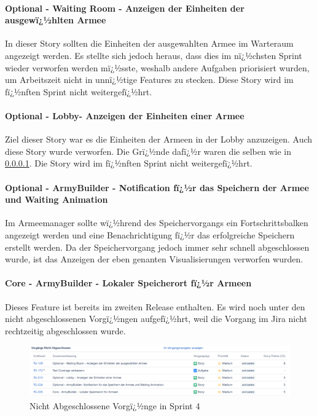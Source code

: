 \documentclass[12pt, titlepage]{scrartcl}
\begin{document}
				\paragraph{Optional - Waiting Room - Anzeigen der Einheiten der ausgewï¿½hlten Armee}
				\label{OWaitingRoomAnzeigenEinheiten}
				In dieser Story sollten die Einheiten der ausgewahlten Armee im Warteraum angezeigt werden. Es stellte sich jedoch heraus, dass dies im nï¿½chsten Sprint wieder verworfen werden mï¿½sste, weshalb andere Aufgaben priorisiert wurden, um Arbeitszeit nicht in unnï¿½tige Features zu stecken. Diese Story wird im fï¿½nften Sprint nicht weitergefï¿½hrt.
				
				\paragraph{Optional - Lobby- Anzeigen der Einheiten einer Armee}
				Ziel dieser Story war es die Einheiten der Armeen in der Lobby anzuzeigen. Auch diese Story wurde verworfen. Die Grï¿½nde dafï¿½r waren die selben wie in \ref{OWaitingRoomAnzeigenEinheiten}. Die Story wird im fï¿½nften Sprint nicht weitergefï¿½hrt.
				
				\paragraph{Optional - ArmyBuilder - Notification fï¿½r das Speichern der Armee und Waiting Animation}
				Im Armeemanager sollte wï¿½hrend des Speichervorgangs ein Fortschrittsbalken angezeigt werden und eine Benachrichtigung fï¿½r das erfolgreiche Speichern erstellt werden. Da der Speichervorgang jedoch immer sehr schnell abgeschlossen wurde, ist das Anzeigen der eben genanten Visualisierungen verworfen wurden.
				
				\paragraph{Core - ArmyBuilder - Lokaler Speicherort fï¿½r Armeen}
				Dieses Feature ist bereits im zweiten Release enthalten. Es wird noch unter den nicht abgeschlossenen Vorgï¿½ngen aufgefï¿½hrt, weil die Vorgang im Jira nicht rechtzeitig abgeschlossen wurde.
			
				
			\begin{figure}[H] 
				\centering
				\includegraphics[width=1\textwidth]{Nicht_Abgeschlossene_Vorgaenge_Sprint_4.PNG}
				\caption{Nicht Abgeschlossene Vorgï¿½nge in Sprint 4}
				\label{NichtAbgeschlosseneVorgaengeSprint4}
			\end{figure}
		
\end{document}
